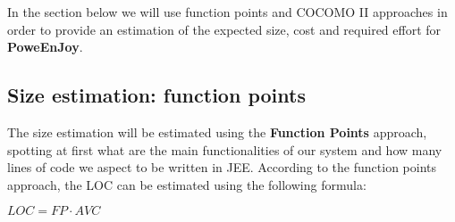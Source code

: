 In the section below we will use function points and COCOMO II approaches in order to provide an estimation of the expected size, cost and required effort for \textbf{PoweEnJoy}.



\subsection{Size estimation: function points}
The size estimation will be estimated using the \textbf{Function Points} approach, spotting at first what are the main functionalities of our system and how many lines of code we aspect to be written in JEE. According to the function points approach, the LOC can be estimated using the following formula:

\begin{center}
$LOC =  FP \cdot AVC $
\end{center}

